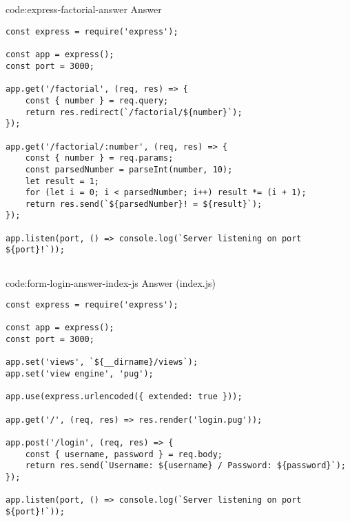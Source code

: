 \subsection*{}

\begin{code}{code:express-factorial-answer}{ Answer}
\begin{verbatim}
const express = require('express');

const app = express();
const port = 3000;

app.get('/factorial', (req, res) => {
    const { number } = req.query;
    return res.redirect(`/factorial/${number}`);
});

app.get('/factorial/:number', (req, res) => {
    const { number } = req.params;
    const parsedNumber = parseInt(number, 10);
    let result = 1;
    for (let i = 0; i < parsedNumber; i++) result *= (i + 1);
    return res.send(`${parsedNumber}! = ${result}`);
});

app.listen(port, () => console.log(`Server listening on port ${port}!`));
\end{verbatim}
\end{code}

\subsection*{}

\begin{code}{code:form-login-answer-index-js}{ Answer (index.js)}
\begin{verbatim}
const express = require('express');

const app = express();
const port = 3000;

app.set('views', `${__dirname}/views`);
app.set('view engine', 'pug');

app.use(express.urlencoded({ extended: true }));

app.get('/', (req, res) => res.render('login.pug'));

app.post('/login', (req, res) => {
    const { username, password } = req.body;
    return res.send(`Username: ${username} / Password: ${password}`);
});

app.listen(port, () => console.log(`Server listening on port ${port}!`));
\end{verbatim}
\end{code}

